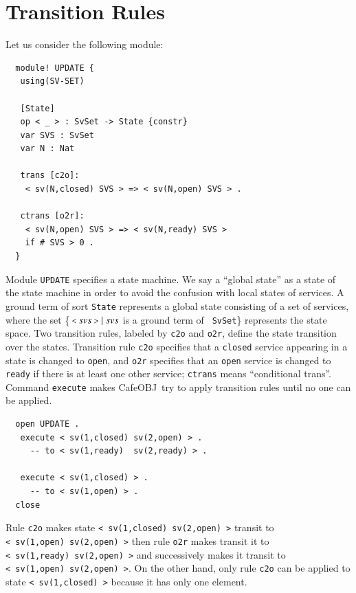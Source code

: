 \documentclass[12pt]{report}
\newcommand{\mbstt}[1]{\mbox{\small{\tt {#1}}}}
\newcommand{\stt}[1]{{\small{\tt {#1}}}}
\newcommand{\cafeobj}{{\sf CafeOBJ}~}
\begin{document}
\section{Transition Rules}
\label{sec:rules}
Let us consider the following module:
\begin{verbatim}
  module! UPDATE {
   using(SV-SET)
  
   [State]
   op < _ > : SvSet -> State {constr}
   var SVS : SvSet    
   var N : Nat
  
   trans [c2o]: 
    < sv(N,closed) SVS > => < sv(N,open) SVS > .
  
   ctrans [o2r]: 
    < sv(N,open) SVS > => < sv(N,ready) SVS >
    if # SVS > 0 . 
  }
\end{verbatim}
Module {\tt UPDATE} specifies a state machine. We say a ``global state''
as a state of the state machine in order to avoid the confusion with
local states of services. A ground term of sort {\tt State} represents
a global state consisting of a set of services, where the set
\{$\ \mbstt{<}\ svs\ \mbstt{>}\mid svs$ is a ground term of {\tt
  SvSet}\} represents the state space. Two transition rules, labeled
by {\tt c2o} and {\tt o2r}, define the state transition over the
states.  Transition rule {\tt c2o} specifies that a {\tt closed}
service appearing in a state is changed to {\tt open}, and {\tt o2r}
specifies that an {\tt open} service is changed to {\tt ready} if
there is at least one other service; {\tt ctrans} means ``conditional
trans''.  Command {\tt execute} makes \cafeobj try to apply transition
rules until no one can be applied.
\begin{verbatim}
  open UPDATE .
   execute < sv(1,closed) sv(2,open) > .
     -- to < sv(1,ready)  sv(2,ready) > .

   execute < sv(1,closed) > .
     -- to < sv(1,open) > .
  close
\end{verbatim}
Rule {\tt c2o} makes state \stt{<~sv(1,closed)~sv(2,open)~>} transit
to \stt{<~sv(1,open)~sv(2,open)~>} then rule {\tt o2r} makes transit
it to \stt{<~sv(1,ready)~sv(2,open)~>} and successively makes it
transit to \stt{<~sv(1,open)~sv(2,open)~>}. On the other hand,
only rule {\tt c2o} can be applied to state \stt{<~sv(1,closed)~>}
because it has only one element.
\end{document}
